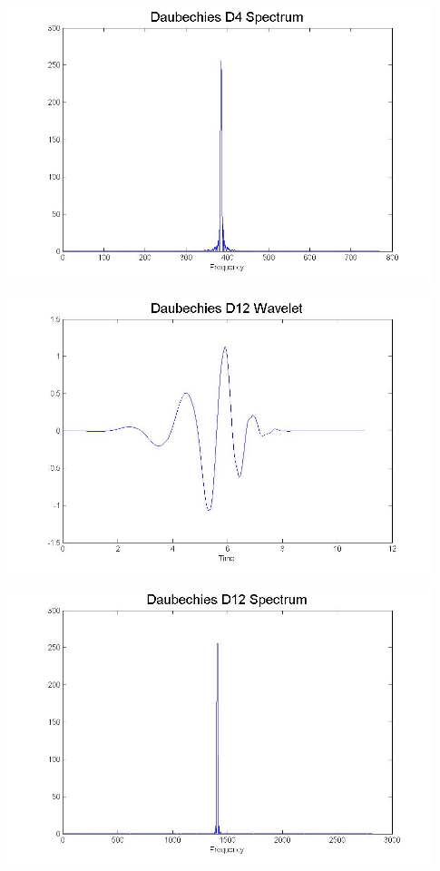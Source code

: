 \documentclass[10pt]{beamer}
\begin{document}
\begin{frame}
\includegraphics[height=8cm]{D4Spec}
\end{frame}

\begin{frame}
\includegraphics[height=8cm]{D12}
\end{frame}

\begin{frame}
\includegraphics[height=8cm]{D12Spec}
\end{frame}
\end{document}
